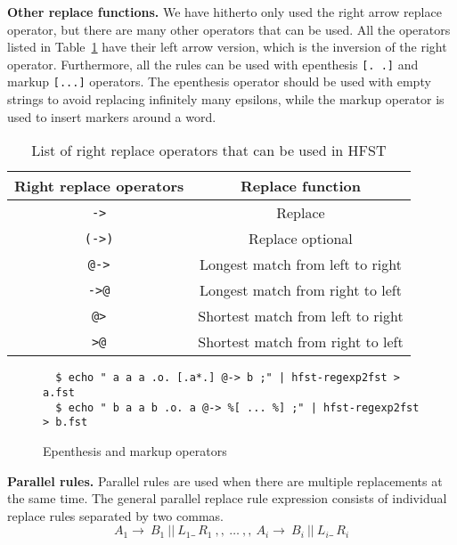 \documentclass{llncs}
\begin{document}

\textbf{Other replace functions.} We have hitherto only used the right arrow replace operator,
but there are many other operators that can be used. 
All the operators listed in Table~\ref{tab:replace_operators} have their left arrow version, 
which is the inversion of the right operator. Furthermore, all the rules can be used 
with epenthesis \verb![. .]! and markup \verb![...]! operators. 
The epenthesis operator should be used with empty strings to avoid replacing infinitely 
many epsilons, while the markup operator is used to insert markers around a word.

\begin{table} [h!]
  \centering
  \caption{List of right replace operators that can be used in HFST}
  \begin{tabular}{| c | c |} 
    \hline
    Right replace operators & Replace function \\ \hline\hline
    \verb!->!   & Replace \\ \hline
    \verb!(->)! & Replace optional \\ \hline
    \verb!@->!  & Longest match from left to right \\ \hline
    \verb!->@!  & Longest match from right to left \\ \hline
    \verb!@>!   & Shortest match from left to right \\ \hline
    \verb!>@!   & Shortest match from right to left \\ \hline
  \end{tabular}
  \label{tab:replace_operators}
\end{table}



\begin{figure} [h!]
{\scriptsize
\begin{verbatim}
  $ echo " a a a .o. [.a*.] @-> b ;" | hfst-regexp2fst > a.fst
  $ echo " b a a b .o. a @-> %[ ... %] ;" | hfst-regexp2fst > b.fst
\end{verbatim}
}
\caption{Epenthesis and markup operators}
\label{fig:epenthesis_markup}
\end{figure}



\textbf{Parallel rules.} Parallel rules are used when there are 
multiple replacements at the same time. The general parallel replace rule expression 
consists of individual replace rules separated by two commas.
\begin{equation}
  A_1 \rightarrow\ B_1\ ||\ L_1 \_\  R_1\ ,,\ \ldots\ ,,\ A_i \rightarrow\ B_i\ ||\ L_i \_\ R_i
\end{equation}
\end{document}
